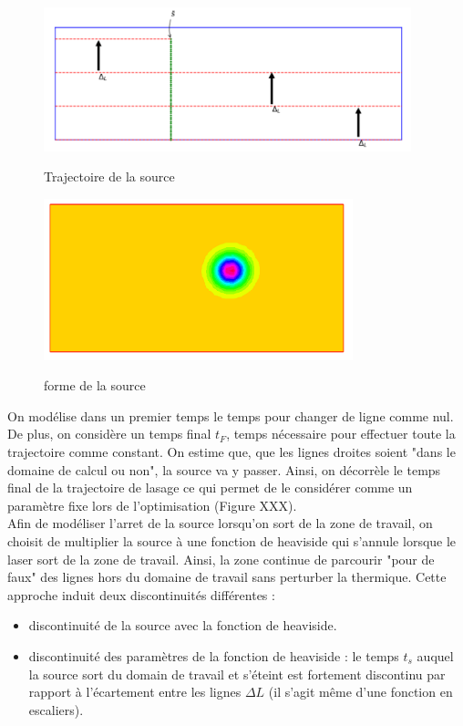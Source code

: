 \documentclass[11pt,a4paper]{article}
\begin{document}
\begin{figure}[H]
	\begin{minipage}{0.48\textwidth}
		\label{fig:trajectoire}
		\centering
		\includegraphics[width=0.95\textwidth]{trajectoire}
		\caption{Trajectoire de la source}
	\end{minipage}
	\begin{minipage}{0.48\textwidth}
		\label{fig:source}
		\centering
		\includegraphics[width=0.8\textwidth]{source}
		\caption{forme de la source}
	\end{minipage}
\end{figure}

On modélise dans un premier temps le temps pour changer de ligne comme nul. De plus, on considère un temps final $t_F$, temps nécessaire pour effectuer toute la trajectoire comme constant. On estime que, que les lignes droites soient "dans le domaine de calcul ou non", la source va y passer. Ainsi, on décorrèle le temps final de la trajectoire de lasage ce qui permet de le considérer comme un paramètre fixe lors de l'optimisation (Figure XXX). \\
Afin de modéliser l'arret de la source lorsqu'on sort de la zone de travail, on choisit de multiplier la source à une fonction de heaviside qui s'annule lorsque le laser sort de la zone de travail. Ainsi, la zone continue de parcourir "pour de faux" des lignes hors du domaine de travail sans perturber la thermique. Cette approche induit deux discontinuités différentes : 
\begin{itemize}
	\item discontinuité de la source avec la fonction de heaviside.
	\item discontinuité des paramètres de la fonction de heaviside : le temps $t_s$ auquel la source sort du domain de travail et s'éteint est fortement discontinu par rapport à l'écartement entre les lignes $\Delta L$ (il s'agit même d'une fonction en escaliers).  
\end{itemize}
\end{document}
